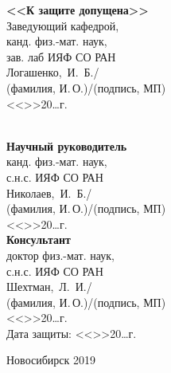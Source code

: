 \documentclass[a4paper,11pt]{extreport}
\begin{document}
\noindent
\vspace*{11pt}
\begin{multicols}{2}
	\textbf{<<К защите допущена>>} \\			
	Заведующий кафедрой,\\           			
	канд. физ.-мат. наук,\\   			
	зав. лаб ИЯФ СО РАН\\            			
	Логашенко,~И.~Б./\makebox[3cm]{\dotfill}\\
	\small{(фамилия, И.\,О.)/(подпись, МП)}\\
	<<\makebox[0.7cm]{\dotfill}>>\makebox[3cm]{\dotfill}20\dots г.\\
\columnbreak

	\phantom{\hspace{1pt}}\\
	\textbf{Научный руководитель} \\
	канд. физ.-мат. наук, \\
	с.н.с. ИЯФ СО РАН\\
	Николаев,~И.~Б./\makebox[3cm]{\dotfill}\\
	\small{(фамилия, И.\,О.)/(подпись, МП)}\\
	<<\makebox[0.7cm]{\dotfill}>>\makebox[3cm]{\dotfill}20\dots г.\\
	\vspace{11pt}
	\textbf{Консультант} \\
	доктор физ.-мат. наук, \\
	с.н.с. ИЯФ СО РАН\\
	Шехтман,~Л.~И./\makebox[3cm]{\dotfill}\\
	\small{(фамилия, И.\,О.)/(подпись, МП)}\\
	<<\makebox[0.7cm]{\dotfill}>>\makebox[3cm]{\dotfill}20\dots г.\\
	\vspace{11pt}
	Дата защиты: <<\makebox[0.7cm]{\dotfill}>>\makebox[3cm]{\dotfill}20\dots г.\\
\end{multicols}


\vspace{11pt}


\vfill

\begin{center}
	Новосибирск 2019
\end{center}
\end{document}
